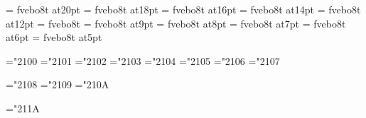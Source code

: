 \font\twentyslbf=      fvebo8t at20pt
\font\eighteenslbf=    fvebo8t at18pt
\font\sixteenslbf=     fvebo8t at16pt
\font\fourteenslbf=    fvebo8t at14pt
\font\twelveslbf=      fvebo8t at12pt
\font\slbf=            fvebo8t
\font\nineslbf=        fvebo8t at9pt
\font\eightslbf=       fvebo8t at8pt
\font\sevenslbf=       fvebo8t at7pt
\font\sixslbf=         fvebo8t at6pt
\font\fiveslbf=        fvebo8t at5pt



%
%
\mathchardef\Gamma="2100
\mathchardef\Delta="2101
\mathchardef\Theta="2102
\mathchardef\Lambda="2103
\mathchardef\Xi="2104
\mathchardef\Pi="2105
\mathchardef\Sigma="2106
\mathchardef\Upsilon="2107

\mathchardef\Phi="2108
\mathchardef\Psi="2109
\mathchardef\Omega="210A

\mathchardef\varrho="211A

%
\rm 